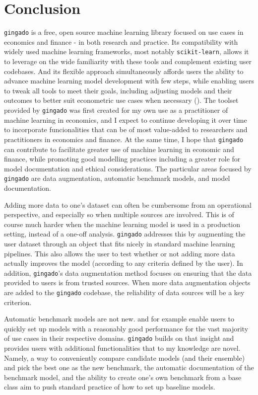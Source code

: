 \documentclass{article}
\begin{document}
\section{Conclusion}

\texttt{gingado} is a free, open source machine learning library focused on use cases in economics and finance - in both research and practice. Its compatibility with widely used machine learning frameworks, most notably \texttt{scikit-learn}, allows it to leverage on the wide familiarity with these tools and complement existing user codebases. And its flexible approach simultaneously affords users the ability to advance machine learning model development with few steps, while enabling users to tweak all tools to meet their goals, including adjusting models and their outcomes to better suit econometric use cases when necessary  (\cite{doi:10.1146/annurev-economics-080217-053433}). The toolset provided by \texttt{gingado} was first created for my own use as a practitioner of machine learning in economics, and I expect to continue developing it over time to incorporate funcionalities that can be of most value-added to researchers and practitioners in economics and finance. At the same time, I hope that \texttt{gingado} can contribute to facilitate greater use of machine learning in economic and finance, while promoting good modelling practices including a greater role for model documentation and ethical considerations. The particular areas focused by \texttt{gingado} are data augmentation, automatic benchmark models, and model documentation.

Adding more data to one's dataset can often be cumbersome from an operational perspective, and especially so when multiple sources are involved. This is of course much harder when the machine learning model is used in a production setting, instead of a one-off analysis. \texttt{gingado} addresses this by augmenting the user dataset through an object that fits nicely in standard machine learning pipelines. This also allows the user to test whether or not adding more data actually improves the model (according to any criteria defined by the user). In addition, \texttt{gingado}'s data augmentation method focuses on ensuring that the data provided to users is from trusted sources. When more data augmentation objects are added to the \texttt{gingado} codebase, the reliability of data sources will be a key criterion.

Automatic benchmark models are not new. \cite{fastai} and \cite{taylor2018forecasting} for example enable users to quickly set up models with a reasonably good performance for the vast majority of use cases in their respective domains. \texttt{gingado} builds on that insight and provides users with additional functionalities that to my knowledge are novel. Namely, a way to conveniently compare candidate models (and their ensemble) and pick the best one as the new benchmark, the automatic documentation of the benchmark model, and the ability to create one's own benchmark from a base class aim to push standard practice of how to set up baseline models.
\end{document}
